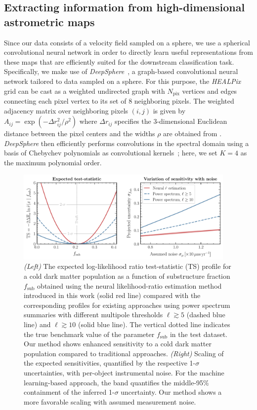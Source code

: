\documentclass[twocolumn]{aastex631}
\newcommand{\package}[1]{\textsl{#1}\xspace}
\newcommand{\healpix}{\package{HEALPix}}
\newcommand{\deepsphere}{\package{DeepSphere}}
\begin{document}
\subsection{Extracting information from high-dimensional astrometric maps} 
\label{sec:neural_network}

Since our data consists of a velocity field sampled on a sphere, we use a spherical convolutional neural network in order to directly learn useful representations from these maps that are efficiently suited for the downstream classification task. Specifically, we make use of \deepsphere~\citep{2020arXiv201215000D,deepsphere_cosmo}, a graph-based convolutional neural network tailored to data sampled on a sphere. For this purpose, the \healpix grid can be cast as a weighted undirected graph with $N_\mathrm{pix}$ vertices and edges connecting each pixel vertex to its set of 8 neighboring pixels. The weighted adjacency matrix over neighboring pixels $(i, j)$ is given by $A_{ij} = \exp \left(-{\Delta r_{ij}^{2}}/{\rho^{2}}\right)$ where $\Delta r_{ij}$ specifies the 3-dimensional Euclidean distance between the pixel centers and the widths $\rho$ are obtained from \citet{2020arXiv201215000D}. \deepsphere then efficiently performs convolutions in the spectral domain using a basis of Chebychev polynomials as convolutional kernels~\citep{2016arXiv160609375D}; here, we set $K=4$ as the maximum polynomial order. 

\begin{figure}[!htbp]
\centering
\includegraphics[width=0.95\textwidth]{figures/results}
\caption{\emph{(Left)} The expected log-likelihood ratio test-statistic (TS) profile for a cold dark matter population as a function of substructure fraction $f_\mathrm{sub}$ obtained using the neural likelihood-ratio estimation method introduced in this work (solid red line) compared with the corresponding profiles for existing approaches using power spectrum summaries with different multipole thresholds $\ell \gtrsim 5$ (dashed blue line) and $\ell \gtrsim 10$ (solid blue line). The vertical dotted line indicates the true benchmark value of the parameter $f_\mathrm{sub}$ in the test dataset. Our method shows enhanced sensitivity to a cold dark matter population compared to traditional approaches. \emph{(Right)} Scaling of the expected sensitivities, quantified by the respective 1-$\sigma$ uncertainties, with per-object instrumental noise. For the machine learning-based approach, the band quantifies the middle-95\% containment of the inferred 1-$\sigma$ uncertainty. Our method shows a more favorable scaling with assumed measurement noise.}
\label{fig:experiment}
\end{figure}
\end{document}
